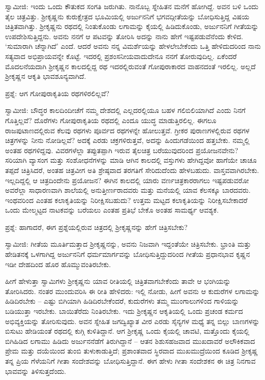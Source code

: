 ಸ್ವಾಮೀಜಿ: ಇಂದು ಒಂದು ಕೌತುಕದ ಸಂಗತಿ ಜರುಗಿತು. ನಾನೊಬ್ಬ ಸ್ನೇಹಿತನ ಮನೆಗೆ ಹೋಗಿದ್ದೆ. ಅವನ ಬಳಿ ಒಂದು ತೈಲ ಚಿತ್ರವಿತ್ತು. ಶ‍್ರೀಕೃಷ್ಣನು ಕುರುಕ್ಷೇತ್ರದ ಭೂಮಿಯಲ್ಲಿ ಅರ್ಜುನನಿಗೆ ಭಗವದ್ಗೀತೆಯನ್ನು ಬೋಧಿಸುತ್ತಿದ್ದ ವಿಷಯ ಚಿತ್ರಿತವಾಗಿತ್ತು. ಶ‍್ರೀಕೃಷ್ಣನು ರಥದಲ್ಲಿ ನಿಂತುಕೊಂಡು ಲಗಾಮನ್ನು ಕೈಯಲ್ಲಿ ಹಿಡಿದುಕೊಂಡು, ಅರ್ಜುನನಿಗೆ ಗೀತೆಯನ್ನು ಉಪದೇಶಿಸುತ್ತಿದ್ದನು. ಅವನು ನನಗೆ ಆ ಪಟವನ್ನು ತೋರಿಸಿ ಅದನ್ನು ನಾನು ಹೇಗೆ ಇಷ್ಟಪಡುವೆನೆಂದು ಕೇಳಿದ. ‘ಸುಮಾರಾಗಿ ಚೆನ್ನಾಗಿದೆ’ ಎಂದೆ. ಆದರೆ ಅವನು ನನ್ನ ವಿಮರ್ಶೆಯನ್ನು ಹೇಳಲೇಬೇಕೆಂದು ಒತ್ತಿ ಹೇಳಿದುದರಿಂದ ನಾನು ಸತ್ಯವಾದ ಅಭಿಪ್ರಾಯವನ್ನೇ ಕೊಟ್ಟೆ. ಇದರಲ್ಲಿ ಪ್ರಶಂಸನೀಯವಾದುದೇನೂ ನನಗೆ ತೋರುವುದಿಲ್ಲ. ಏಕೆಂದರೆ ಮೊದಲನೆಯದಾಗಿ ಶ‍್ರೀಕೃಷ್ಣನ ಕಾಲದಲ್ಲಿದ್ದ ರಥ ಇದರಲ್ಲಿರುವಂತೆ ಗೋಪುರಾಕಾರದ ವಾಹನದಂತೆ ಇರಲಿಲ್ಲ. ಅಲ್ಲದೆ ಶ‍್ರೀಕೃಷ್ಣನ ಆಕೃತಿ ಭಾವಶೂನ್ಯವಾಗಿದೆ.

ಪ್ರಶ್ನೆ: ಆಗ ಗೋಪುರಾಕೃತಿಯ ರಥಗಳಿರಲಿಲ್ಲವೆ?

ಸ್ವಾಮೀಜಿ: ಬೌದ್ಧರ ಕಾಲದಿಂದೀಚೆಗೆ ನಮ್ಮ ದೇಶದಲ್ಲಿ ಎಲ್ಲದರಲ್ಲಿಯೂ ಬಹಳ ಗಲಿಬಿಲಿಯಾಗಿದೆ ಎಂದು ನಿನಗೆ ಗೊತ್ತಿಲ್ಲವೆ? ದೊರೆಗಳು ಗೋಪುರಾಕೃತಿಯ ರಥದಲ್ಲಿ ಎಂದೂ ಯುದ್ಧ ಮಾಡುತ್ತಿರಲಿಲ್ಲ. ಈಗಲೂ ರಾಜಪುಟಾಣದಲ್ಲಿರುವ ಕೆಲವು ರಥಗಳು ಪೂರ್ವದ ರಥಗಳನ್ನೇ ಹೋಲುತ್ತವೆ. ಗ್ರೀಕರ ಪುರಾಣಗಳಲ್ಲಿರುವ ರಥಗಳ ಚಿತ್ರಗಳನ್ನು ನೀನು ನೋಡಿಲ್ಲವೆ? ಅದಕ್ಕೆ ಎರಡು ಚಕ್ರಗಳಿರುತ್ತವೆ, ಅದನ್ನು ಹಿಂದುಗಡೆಯಿಂದ ಹತ್ತಬೇಕು. ನಮ್ಮಲ್ಲಿ ಅಂತಹ ರಥಗಳಿದ್ದವು. ವಿವರಗಳೆಲ್ಲಾ ತಪ್ಪುತಪ್ಪಾಗಿ ಇರುವ ತೈಲಚಿತ್ರ ಬರೆಯುವುದರಿಂದ ಪ್ರಯೋಜನವೇನು? ಸರಿಯಾಗಿ ವ್ಯಾಸಂಗ ಮತ್ತು ಸಂಶೋಧನೆಗಳನ್ನು ಮಾಡಿ ಆಗಿನ ಕಾಲದಲ್ಲಿ ವಸ್ತುಗಳು ಹೇಗಿದ್ದವೋ ಹಾಗೆಯೇ ಚಾಚೂ ತಪ್ಪದೆ ಚಿತ್ರಿಸಿದರೆ, ಅಂತಹ ಚಿತ್ರವೀಗ ಅತಿ ಶ್ರೇಷ್ಠವಾದ ತರಗತಿಗೆ ಸೇರಿದುದೆಂದು ಹೇಳಬಹುದು. ವಾಸ್ತವವಾಗಿರಬೇಕು. ಇಲ್ಲದಿದ್ದಲ್ಲಿ ಆ ಚಿತ್ರದಿಂದೇನು ಪ್ರಯೋಜನ? ಈಗಿನ ಕಾಲದಲ್ಲಿ ಯಾರು ವರ್ಣಚಿತ್ರಕಾರರಾಗಲು ಇಷ್ಟಪಡುವರೋ ಅವರೆಲ್ಲಾ ಸಾಧಾರಣವಾಗಿ ಶಾಲೆಯಲ್ಲಿ ಅನುತ್ತೀರ್ಣರಾದವರು ಮತ್ತು ಮನೆಯಲ್ಲಿ ಯಾವ ಕೆಲಸಕ್ಕೂ ಬಾರದವರು. ಇಂಥವರಿಂದ ಎಂತಹ ಕಲಾಕೃತಿಯನ್ನು ನಿರೀಕ್ಷಿಸಬಹುದು? ಉತ್ತಮ ಮಟ್ಟದ ಕಲಾಕೃತಿಯನ್ನು ನಿರೀಕ್ಷಿಸಬೇಕಾದರೆ ಒಂದು ಮೇಲ್ಮಟ್ಟದ ನಾಟಕವನ್ನು ಬರೆಯಲು ಎಂತಹ ಪ್ರತಿಭೆ ಬೇಕೊ ಅಂತಹ ಸಾಮರ್ಥ್ಯ ಆವಶ್ಯಕ.

ಪ್ರಶ್ನೆ: ಹಾಗಾದರೆ, ಈಗ ಪ್ರಶ್ನೆಯಲ್ಲಿರುವ ಚಿತ್ರದಲ್ಲಿ ಶ‍್ರೀಕೃಷ್ಣನನ್ನು ಹೇಗೆ ಚಿತ್ರಿಸಬೇಕು?

ಸ್ವಾಮೀಜಿ: ಗೀತೆಯ ಮೂರ್ತಿಮತ್ತಾದ ಶ‍್ರೀಕೃಷ್ಣನನ್ನು, ಅವನು ನಿಜವಾಗಿ ಇದ್ದಂತೆಯೇ ಚಿತ್ರಿಸಬೇಕು. ಭ್ರಾಂತಿ ಮತ್ತು ಹೇಡಿತನಕ್ಕೆ ಒಳಗಾಗಿದ್ದ ಅರ್ಜುನನಿಗೆ ಧರ್ಮಮಾರ್ಗವನ್ನು ಬೋಧಿಸುತ್ತಿದ್ದುದರಿಂದ ಗೀತೆಯ ಪ್ರಧಾನಭಾವ ಕೃಷ್ಣನ ಇಡೀ ದೇಹದಿಂದ ಹೊರ ಹೊಮ್ಮುವಂತಿರಬೇಕು.

ಹೀಗೆ ಹೇಳುತ್ತಾ ಸ್ವಾಮಿಗಳು ಶ‍್ರೀಕೃಷ್ಣನು ಯಾವ ರೀತಿಯಲ್ಲಿ ಚಿತ್ರಿತವಾಗಬೇಕೆಂದು ತಾವೇ ಆ ಭಂಗಿಯನ್ನು ತೋರಿಸಿದರು. ನಂತರ ಮುಂದುವರಿಸಿ ಈ ರೀತಿ ಹೇಳಿದರು: ಇಲ್ಲಿ ನೋಡು, ಹೀಗೆ ಅವನು ಆ ಕುದುರೆಗಳ ಲಗಾಮನ್ನು ಹಿಡಿದಿರಬೇಕು – ಎಷ್ಟು ಬಿಗಿಯಾಗಿ ಹಿಡಿದಿರಬೇಕೆಂದರೆ, ಕುದುರೆಗಳು ತಮ್ಮ ಮುಂಗಾಲುಗಳಿಂದ ಗಾಳಿಯನ್ನು ಬಡಿಯುತ್ತಾ ಇರಬೇಕು. ಬಾಯಿತೆರೆದು ನಿಂತಿರಬೇಕು. ಇದು ಶ‍್ರೀಕೃಷ್ಣನ ಆಕೃತಿಯಲ್ಲಿ ಒಂದು ಪ್ರಚಂಡ ಕರ್ಮದ ಅಭಿವ್ಯಕ್ತಿಯನ್ನು ತೋರಿಸುವುದು. ಅವನ ಸ್ನೇಹಿತ ಜಗದ್ವಿಖ್ಯಾತ ವೀರ ಎರಡು ಸೈನ್ಯಗಳ ಮಧ್ಯೆ ತನ್ನ ಬಿಲ್ಲು ಬಾಣಗಳನ್ನು ಬಿಸುಟು ಹೇಡಿಯಂತೆ ರಥದಲ್ಲಿ ಕುಗ್ಗಿ ಕುಳಿತಿದ್ದಾನೆ. ಆಗ ಶ‍್ರೀಕೃಷ್ಣ ಒಂದು ಕೈಯಲ್ಲಿ ಚಾವಟಿ, ಮತ್ತೊಂದು ಕೈಯಲ್ಲಿ ಬಿಗಿಹಿಡಿದ ಲಗಾಮು ಹಿಡಿದು ಅರ್ಜುನನೆಡೆಗೆ ತಿರುಗಿದ್ದಾನೆ – ಆತನ ಶಿಶುಸಹಜವಾದ ಮುಖದಾವರೆ ಅಲೌಕಿಕವಾದ ಪ್ರೇಮ ಮತ್ತು ದಯೆಯಿಂದ ತುಂಬಿ ತುಳುಕಾಡುತ್ತಿದೆ; ಪ್ರಶಾಂತವಾದ ಸ್ಥಿರವಾದ ಮುಖಮುದ್ರೆಯಿಂದ ಕೂಡಿದ ಶ‍್ರೀಕೃಷ್ಣ ತನ್ನ ಪ್ರಿಯ ಗೆಳೆಯನಿಗೆ ಗೀತಾ ಸಂದೇಶವನ್ನು ಬೋಧಿಸುತ್ತಿದ್ದಾನೆ. ಈಗ ಹೇಳು ಗೀತಾ ಸಂದೇಶಕನ ಈ ಚಿತ್ರ ನಿನಗಾವ ಭಾವವನ್ನು ತಿಳಿಸುತ್ತದೆಂದು.

